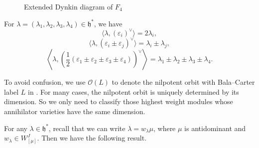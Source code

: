 \documentclass[reqno,12pt]{amsart}
\numberwithin{equation}{section}
\theoremstyle{plain}
\theoremstyle{definition}
\newcommand{\lam}{\lambda}
\newcommand{\ep}{\varepsilon}
\renewcommand{\subset}{\subseteq}
\newcommand{\bil}[2]{\langle{#1},{#2}^{\vee} \rangle }
\newcommand{\hs}{ \mathfrak{h}^*}
\newcommand{\aff}{ \mathbf{a} }
\begin{document}
\begin{figure}[htpb]
	\centering 
	\caption{Extended Dynkin diagram of $ F_4 $ }
	\label{df4}
\end{figure}








\hspace{2cm}










For $ \lam=(\lam_1,\lam_2,\lam_3,\lam_4)\in\hs $, we have \[
\bil{\lam}{(\ep_i)}=2\lam_i,
\]
\[
\bil{\lam}{(\ep_i\pm \ep_j)}=\lam_i\pm \lam_j,
\]
\[
\left\langle{\lam},{\left(\frac12(\ep_1\pm \ep_2\pm\ep_3\pm \ep_4) \right)^{\vee}}\right\rangle=\lam_1\pm\lam_2\pm \lam_3\pm \lam_4.
\]










To avoid confusion, we use $\mathcal{O}(L)$ to denote the nilpotent orbit with Bala--Carter label $L$ in \cite{Ca85}. For many cases, the nilpotent orbit is uniquely determined by its dimension. So we only need to classify those highest weight modules whose annihilator varieties have the same dimension. 

For any $\lambda\in\mathfrak{h}^*$, recall that we can write $\lambda=w_{\lambda}\mu$, where $\mu$ is antidominant and $w_{\lambda}\in W_{[\mu]}^J$.  Then we have the following result.
\end{document}
